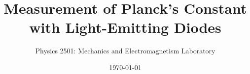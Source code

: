 \documentclass{revtex4}
\begin{document}

\title{Measurement of Planck's Constant with Light-Emitting Diodes}


\author{Physics 2501: Mechanics and Electromagnetism Laboratory}


\date{\today}




\maketitle

\end{document}
